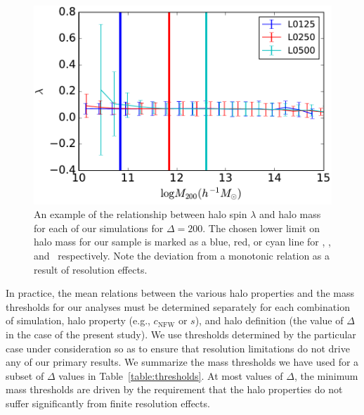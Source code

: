\documentclass[usenatbib,usegraphicx,letterpaper]{mn2e}
\begin{document}
\begin{figure}
\centering
\includegraphics[width=.5\textwidth]{masscut_spin_d200.pdf}
\caption{
An example of the relationship between halo spin $\lambda$ 
and halo mass for each of our simulations for $\Delta =200$. 
The chosen lower limit on halo mass for our sample is marked 
as a blue, red, or cyan line for \simA, \simB, and \simC \ respectively. 
Note the deviation from a monotonic relation as a result of resolution effects.
}
\label{fig:spinrelation}
\end{figure}

In practice, the mean relations between the various halo properties and the mass thresholds for our analyses 
must be determined separately for each combination of simulation, 
halo property (e.g., $c_{\mathrm{NFW}}$ or $s$), 
and halo definition (the value of $\Delta$ in the case of the present study). 
We use thresholds determined by the particular case under consideration so as to ensure that
resolution limitations do not drive any of our primary results. 
We summarize the mass thresholds we have used for a 
subset of $\Delta$ values in Table~\ref{table:thresholds}. 
At most values of $\Delta$, the minimum mass thresholds are 
driven by the requirement that the halo properties do 
not suffer significantly from finite resolution effects.
\end{document}

